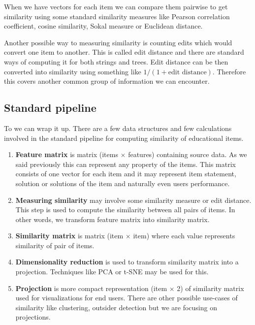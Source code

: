 \documentclass[
  digital, %
  table,   %
  nolof,     %
  nolot,     %
  nocover,
  color
]{fithesis3}
\begin{document}
When we have vectors for each item we can compare them pairwise to get similarity using some standard similarity measures like Pearson correlation coefficient, cosine similarity, Sokal measure or Euclidean distance.


Another possible way to measuring similarity is counting edits which would convert one item to another. This is called edit distance and there are standard ways of computing it for both strings and trees. Edit distance can be then converted into similarity using something like $1 / (1 + \text{edit distance})$. Therefore this covers another common group of information we can encounter.


\subsection{Standard pipeline}\label{standard-pipeline}

To we can wrap it up. There are a few data structures and few calculations involved in the standard pipeline for computing similarity of educational items.

\begin{enumerate}
  \item
    \textbf{Feature matrix} is matrix (items $\times$ features) containing source data. As we said previously this can represent any property of the items. This matrix consists of one vector for each item and it may represent item statement, solution or solutions of the item and naturally even users performance.
  \item
    \textbf{Measuring similarity} may involve some similarity measure or edit distance. This step is used to compute the similarity between all pairs of items. In other words, we transform feature matrix into similarity matrix.
  \item
    \textbf{Similarity matrix} is matrix (item $\times$ item) where each value represents similarity of pair of items.
  \item
    \textbf{Dimensionality reduction} is used to transform similarity matrix into a projection. Techniques like PCA or t-SNE may be used for this.
  \item
    \textbf{Projection} is more compact representation (item $\times$ 2) of similarity matrix used for visualizations for end users. There are other possible use-cases of similarity like clustering, outsider detection but we are focusing on projections.
\end{enumerate}
\end{document}
